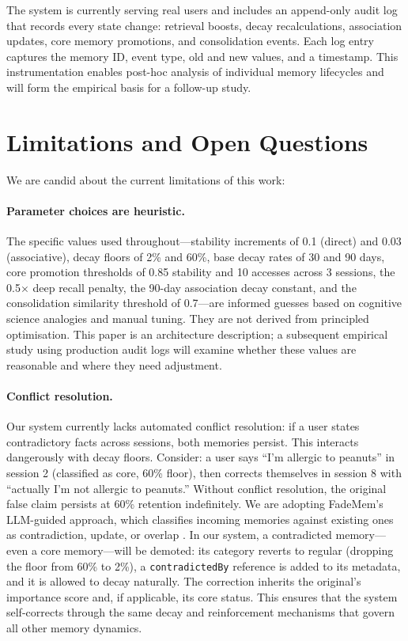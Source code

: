 \documentclass[11pt,a4paper]{article}
\begin{document}
The system is currently serving real users and includes an append-only audit log that records every state change: retrieval boosts, decay recalculations, association updates, core memory promotions, and consolidation events. Each log entry captures the memory ID, event type, old and new values, and a timestamp. This instrumentation enables post-hoc analysis of individual memory lifecycles and will form the empirical basis for a follow-up study.

\section{Limitations and Open Questions}
\label{sec:limitations}

We are candid about the current limitations of this work:

\paragraph{Parameter choices are heuristic.} The specific values used throughout---stability increments of 0.1 (direct) and 0.03 (associative), decay floors of 2\% and 60\%, base decay rates of 30 and 90 days, core promotion thresholds of 0.85 stability and 10 accesses across 3 sessions, the 0.5$\times$ deep recall penalty, the 90-day association decay constant, and the consolidation similarity threshold of 0.7---are informed guesses based on cognitive science analogies and manual tuning. They are not derived from principled optimisation. This paper is an architecture description; a subsequent empirical study using production audit logs will examine whether these values are reasonable and where they need adjustment.

\paragraph{Conflict resolution.} Our system currently lacks automated conflict resolution: if a user states contradictory facts across sessions, both memories persist. This interacts dangerously with decay floors. Consider: a user says ``I'm allergic to peanuts'' in session 2 (classified as core, 60\% floor), then corrects themselves in session 8 with ``actually I'm not allergic to peanuts.'' Without conflict resolution, the original false claim persists at 60\% retention indefinitely. We are adopting FadeMem's LLM-guided approach, which classifies incoming memories against existing ones as contradiction, update, or overlap \citep{wei2026fademem}. In our system, a contradicted memory---even a core memory---will be demoted: its category reverts to regular (dropping the floor from 60\% to 2\%), a \texttt{contradictedBy} reference is added to its metadata, and it is allowed to decay naturally. The correction inherits the original's importance score and, if applicable, its core status. This ensures that the system self-corrects through the same decay and reinforcement mechanisms that govern all other memory dynamics.
\end{document}
